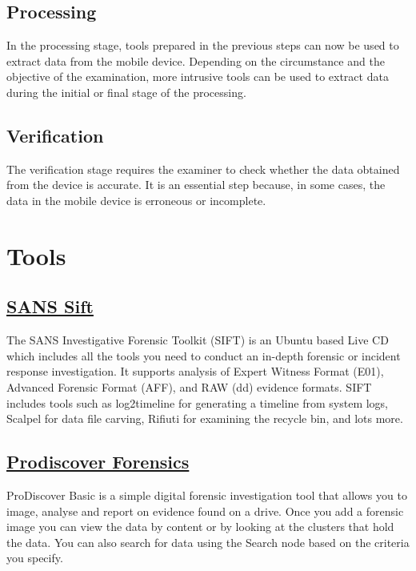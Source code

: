 \documentclass[11pt]{article}
\begin{document}
\subsection{Processing}
In the processing stage, tools prepared in the previous steps can now be used to extract data from the mobile device. Depending on the circumstance and the objective of the examination, more intrusive tools can be used to extract data during the initial or final stage of the processing.

\subsection{Verification}
The verification stage requires the examiner to check whether the data obtained from the device is accurate. It is an essential step because, in some cases, the data in the mobile device is erroneous or incomplete.

\section{Tools}

\subsection{\href{https://www.sans.org/tools/sift-workstation/}{SANS Sift}}


The SANS Investigative Forensic Toolkit (SIFT) is an Ubuntu based Live CD which includes all the tools you need to conduct an in-depth forensic or incident response investigation. It supports analysis of Expert Witness Format (E01), Advanced Forensic Format (AFF), and RAW (dd) evidence formats. SIFT includes tools such as log2timeline for generating a timeline from system logs, Scalpel for data file carving, Rifiuti for examining the recycle bin, and lots more.

\subsection{\href{https://prodiscover.com/prodiscover-forensics}{Prodiscover Forensics}}

ProDiscover Basic is a simple digital forensic investigation tool that allows you to image, analyse and report on evidence found on a drive. Once you add a forensic image you can view the data by content or by looking at the clusters that hold the data. You can also search for data using the Search node based on the criteria you specify.
\end{document}
